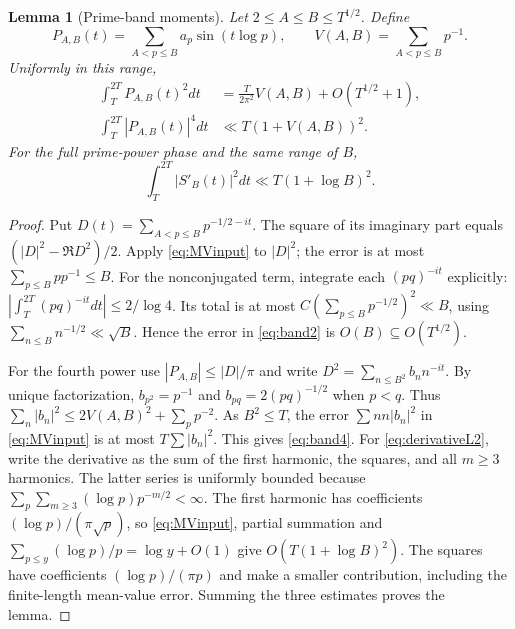 \documentclass[11pt,reqno]{amsart}
\numberwithin{equation}{section}
\newtheorem{lemma}[theorem]{Lemma}
\begin{document}
\begin{lemma}[Prime-band moments]\label{lem:bandmom}
Let $2\le A\le B\le T^{1/2}$. Define
\[
P_{A,B}(t)=\sum_{A<p\le B}a_p\sin(t\log p),\qquad
V(A,B)=\sum_{A<p\le B}p^{-1}.
\]
Uniformly in this range,
\begin{align}
\int_T^{2T}P_{A,B}(t)^2dt
 &=\frac{T}{2\pi^2}V(A,B)+O(T^{1/2}+1),\label{eq:band2}\\
\int_T^{2T}|P_{A,B}(t)|^4dt
 &\ll T(1+V(A,B))^2.\label{eq:band4}
\end{align}
For the full prime-power phase and the same range of $B$,
\begin{equation}\label{eq:derivativeL2}
\int_T^{2T}|S'_B(t)|^2dt\ll T(1+\log B)^2.
\end{equation}
\end{lemma}
\begin{proof}
Put $D(t)=\sum_{A<p\le B}p^{-1/2-it}$.  The square of its imaginary
part equals $(|D|^2-\Re D^2)/2$.  Apply \eqref{eq:MVinput} to
$|D|^2$; the error is at most $\sum_{p\le B}p p^{-1}\le B$.
For the nonconjugated term, integrate each $(pq)^{-it}$ explicitly:
$|\int_T^{2T}(pq)^{-it}dt|\le2/\log4$.  Its total is at most
$C(\sum_{p\le B}p^{-1/2})^2\ll B$, using
$\sum_{n\le B}n^{-1/2}\ll\sqrt B$.  Hence the error in
\eqref{eq:band2} is $O(B)\subseteq O(T^{1/2})$.

For the fourth power use $|P_{A,B}|\le|D|/\pi$ and write
$D^2=\sum_{n\le B^2}b_nn^{-it}$.  By unique factorization,
$b_{p^2}=p^{-1}$ and $b_{pq}=2(pq)^{-1/2}$ when $p<q$.
Thus $\sum_n|b_n|^2\le2V(A,B)^2+\sum_pp^{-2}$.
As $B^2\le T$, the error $\sum nn|b_n|^2$ in
\eqref{eq:MVinput} is at most $T\sum|b_n|^2$.
This gives \eqref{eq:band4}.  For \eqref{eq:derivativeL2},
write the derivative as the sum of the first harmonic,
the squares, and all $m\ge3$ harmonics.  The latter series
is uniformly bounded because
$\sum_p\sum_{m\ge3}(\log p)p^{-m/2}<\infty$.
The first harmonic has coefficients $(\log p)/(\pi\sqrt p)$,
so \eqref{eq:MVinput}, partial summation and
$\sum_{p\le y}(\log p)/p=\log y+O(1)$ give
$O(T(1+\log B)^2)$.  The squares have coefficients
$(\log p)/(\pi p)$ and make a smaller contribution, including
the finite-length mean-value error.  Summing the three estimates
proves the lemma.
\end{proof}
\end{document}
